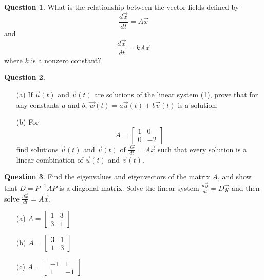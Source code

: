 \documentclass[11pt]{amsart}
\theoremstyle{definition}\newtheorem{definition}{Definition}
\theoremstyle{definition}\newtheorem{notation}{Notation}
\theoremstyle{definition}\newtheorem{example}{Example}
\theoremstyle{definition}\newtheorem{question}{Question}
\theoremstyle{theorem}\newtheorem{theorem}{Theorem}
\theoremstyle{theorem}\newtheorem{corollary}{Corollary}
\theoremstyle{theorem}\newtheorem{proposition}{Proposition}
\theoremstyle{theorem}\newtheorem{lemma}{Lemma}
\theoremstyle{remark}\newtheorem{remark}{Remark}
\begin{document}
\begin{question}
    What is the relationship between the vector fields defined by
    \begin{equation*}
        \frac{d\vec{x}}{dt} = A\vec{x}
    \end{equation*}
    and
    \begin{equation*}
        \frac{d\vec{x}}{dt} = kA\vec{x}
    \end{equation*}
    where $k$ is a nonzero constant?
\end{question}

\begin{question}
    \begin{itemize}
        \item[(a)] If $\vec{u}(t)$ and $\vec{v}(t)$ are solutions of the linear system (1), prove that for any constants $a$ and $b$, $\vec{w}(t) = a\vec{u}(t) + b\vec{v}(t)$ is a solution.
        \item[(b)] For
        \begin{equation*}
            A = \begin{bmatrix}
                1 & 0 \\
                0 & -2
            \end{bmatrix}
        \end{equation*}
        find solutions $\vec{u}(t)$ and $\vec{v}(t)$ of $\frac{d\vec{x}}{dt} = A\vec{x}$ such that every solution is a linear combination of $\vec{u}(t)$ and $\vec{v}(t)$.
    \end{itemize}
\end{question}

\begin{question}
    Find the eigenvalues and eigenvectors of the matrix $A$, and show that $D = P^{-1}AP$ is a diagonal matrix. Solve the linear system $\frac{d\vec{y}}{dt} = D\vec{y}$ and then solve $\frac{d\vec{x}}{dt} = A\vec{x}$.
    \begin{itemize}
        \item[(a)] $A = \begin{bmatrix} 1 & 3 \\ 3 & 1 \end{bmatrix}$
        \item[(b)] $A = \begin{bmatrix} 3 & 1 \\ 1 & 3 \end{bmatrix}$
        \item[(c)] $A = \begin{bmatrix} -1 & 1 \\ 1 & -1 \end{bmatrix}$
    \end{itemize}
\end{question}
\end{document}
